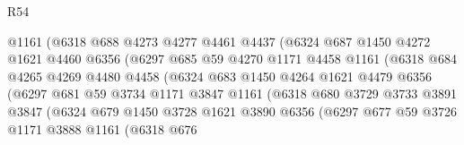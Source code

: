 \begin{lexlean}{R54}
\begin{coremodule}
                          @1161
                          (@6318
                            @688
                            @4273
                            @4277
                            @4461
                            @4437
                            (@6324
                              @687
                              @1450
                              @4272
                              @1621
                              @4460
                              @6356
                              (@6297
                                @685
                                @59
                                @4270
                                @1171
                                @4458
                                @1161
                                (@6318
                                  @684
                                  @4265
                                  @4269
                                  @4480
                                  @4458
                                  (@6324
                                    @683
                                    @1450
                                    @4264
                                    @1621
                                    @4479
                                    @6356
                                    (@6297
                                      @681
                                      @59
                                      @3734
                                      @1171
                                      @3847
                                      @1161
                                      (@6318
                                        @680
                                        @3729
                                        @3733
                                        @3891
                                        @3847
                                        (@6324
                                          @679
                                          @1450
                                          @3728
                                          @1621
                                          @3890
                                          @6356
                                          (@6297
                                            @677
                                            @59
                                            @3726
                                            @1171
                                            @3888
                                            @1161
                                            (@6318
                                              @676

\end{coremodule}
\end{lexlean}
